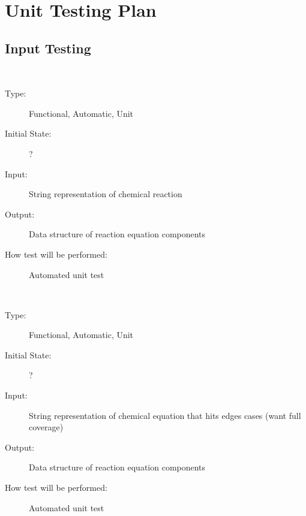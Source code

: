 \documentclass[12pt, titlepage]{article}
\newcounter{testnum} %
\begin{document}
				
\section{Unit Testing Plan}
		
\subsection{Input Testing}

\begin{addmargin}[2em]{0em}
\\
\begin{addmargin}[2em]{0em}
\begin{description}
\item[Type:] Functional, Automatic, Unit
					
\item[Initial State:] ?
					
\item[Input:] String representation of chemical reaction
					
\item[Output:] Data structure of reaction equation components
					
\item[How test will be performed:] Automated unit test \\
\end{description}
\end{addmargin}			
\\
\begin{addmargin}[2em]{0em}
\begin{description}
\item[Type:] Functional, Automatic, Unit
					
\item[Initial State:] ?
					
\item[Input:] String representation of chemical equation that hits edges cases 
  (want full coverage)
					
\item[Output:] Data structure of reaction equation components
					
\item[How test will be performed:] Automated unit test\\
\end{description}
\end{addmargin}
\noindent {}\\


\end{addmargin}
\end{document}
